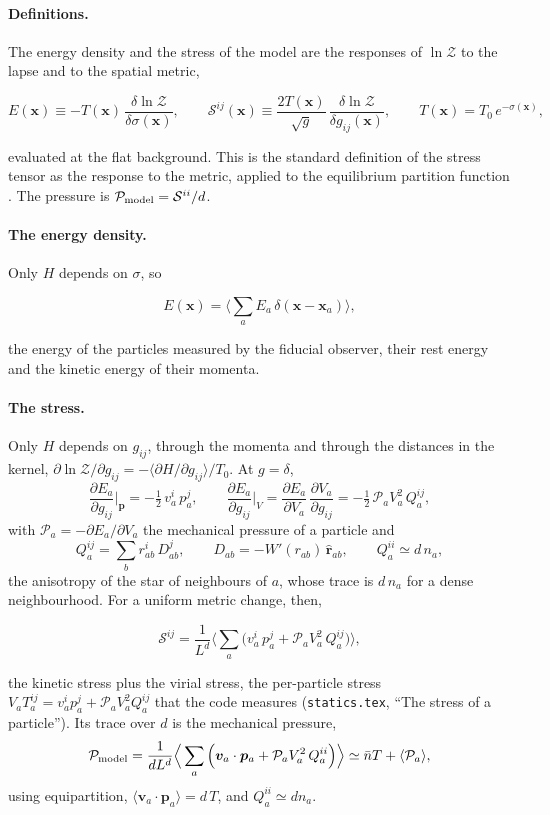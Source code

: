 \documentclass[11pt,aps,preprint,nofootinbib,superscriptaddress,tightenlines]{revtex4-2}
\newcommand{\avg}[1]{\langle #1\rangle}
\def\Sstress{{\mathcal S}}
\def\pr{{\mathcal P}}
\def\st{\begin{equation}}
\def\stp{\end{equation}}
\let\oldparagraph\paragraph
\renewcommand{\paragraph}{\par\bigskip\oldparagraph}
\begin{document}
\paragraph{Definitions.}  The energy density and the stress of the model are the responses of $\ln\mathcal Z$ to the lapse and to the spatial metric,
\begin{keyeq}
\st
E(\bm x)\equiv-T(\bm x)\,\frac{\delta\ln\mathcal Z}{\delta\sigma(\bm x)},\qquad
\Sstress^{ij}(\bm x)\equiv\frac{2T(\bm x)}{\sqrt g}\,\frac{\delta\ln\mathcal Z}{\delta g_{ij}(\bm x)},\qquad T(\bm x)=T_0\,e^{-\sigma(\bm x)} ,
\label{defs}
\stp
\end{keyeq}
evaluated at the flat background.  This is the standard definition of the stress tensor as the response to the metric, applied to the equilibrium
partition function \cite{Jensen:2012jh,Banerjee:2012iz}.  The pressure is $\pr_{\rm model}=\Sstress^{ii}/d$.

\paragraph{The energy density.}  Only $H$ depends on $\sigma$, so
\begin{keyeq}
\st
E(\bm x)=\Big\langle\sum_aE_a\,\delta(\bm x-\bm x_a)\Big\rangle ,
\label{Eop}
\stp
\end{keyeq}
the energy of the particles measured by the fiducial observer, their rest energy and the kinetic energy of their momenta.

\paragraph{The stress.}  Only $H$ depends on $g_{ij}$, through the momenta and through the distances in the kernel, $\partial\ln\mathcal Z/\partial g_{ij}=-\avg{\partial H/\partial g_{ij}}/T_0$.
At $g=\delta$,
\st
\frac{\partial E_a}{\partial g_{ij}}\Big|_{\bm p}=-\tfrac12\,v_a^i\,p_a^j,\qquad
\frac{\partial E_a}{\partial g_{ij}}\Big|_{V}=\frac{\partial E_a}{\partial V_a}\,\frac{\partial V_a}{\partial g_{ij}}=-\tfrac12\,\pr_aV_a^2\,Q_a^{ij},
\stp
with $\pr_a=-\partial E_a/\partial V_a$ the mechanical pressure of a particle and
\st
Q_a^{ij}=\sum_br_{ab}^i\,D_{ab}^j,\qquad D_{ab}=-W'(r_{ab})\,\hat{\bm r}_{ab},\qquad Q_a^{ii}\simeq d\,n_a ,
\stp
the anisotropy of the star of neighbours of $a$, whose trace is $d\,n_a$ for a dense neighbourhood.  For a uniform metric change, then,
\begin{keyeq}
\st
\Sstress^{ij}=\frac1{L^d}\Big\langle\sum_a\Big(v_a^i\,p_a^j+\pr_aV_a^2\,Q_a^{ij}\Big)\Big\rangle ,
\label{Sop}
\stp
\end{keyeq}
the kinetic stress plus the virial stress, the per-particle stress $V_aT_a^{ij}=v_a^ip_a^j+\pr_aV_a^2Q_a^{ij}$ that the code measures (\texttt{statics.tex}, ``The stress
of a particle'').  Its trace over $d$ is the mechanical pressure,
\st
\pr_{\rm model}=\frac1{dL^d}\Big\langle\sum_a\Big(\bm v_a\cdot\bm p_a+\pr_aV_a^2\,Q_a^{ii}\Big)\Big\rangle\simeq\bar nT+\avg{\pr_a} ,
\stp
using equipartition, $\avg{\bm v_a\cdot\bm p_a}=d\,T$, and $Q_a^{ii}\simeq dn_a$.
\end{document}

